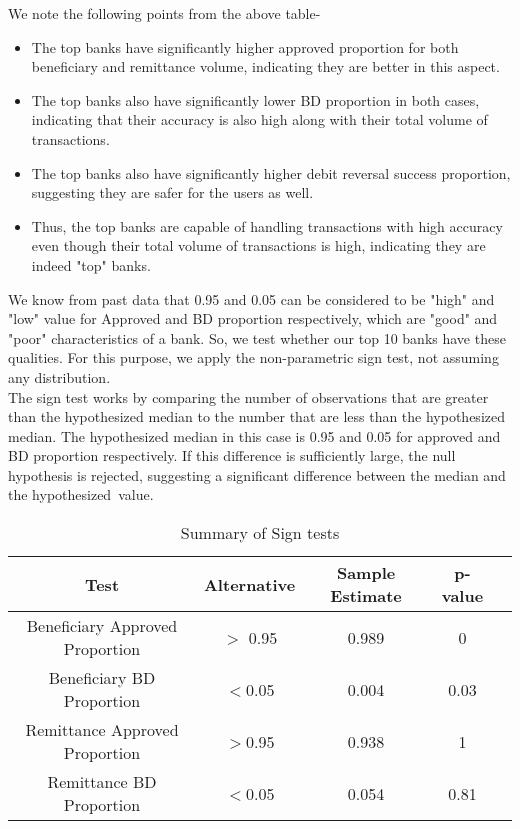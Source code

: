 \documentclass{article}
\begin{document}
We note the following points from the above table-
\begin{itemize}
    \item The top banks have significantly higher approved proportion for both beneficiary and remittance volume, indicating they are better in this aspect.
    \item The top banks also have significantly lower BD proportion in both cases, indicating that their accuracy is also high along with their total volume of transactions.
    \item  The top banks also have significantly higher debit reversal success proportion, suggesting they are safer for the users as well. 
    \item Thus, the top banks are capable of handling transactions with high accuracy even though their total volume of transactions is high, indicating they are indeed "top" banks.
\end{itemize}

We know from past data that 0.95 and 0.05 can be considered to be "high" and "low" value for Approved and BD proportion respectively, which are "good" and "poor" characteristics of a bank. So, we test whether our top 10 banks have these qualities. For this purpose, we apply the non-parametric sign test, not assuming any distribution.\\

The sign test works by comparing the number of observations that are greater than the hypothesized median to the number that are less than the hypothesized median. The hypothesized median in this case is 0.95 and 0.05 for approved and BD proportion respectively. If this difference is sufficiently large, the null hypothesis is rejected, suggesting a significant difference between the median and the hypothesized value.

\begin{table}[h]
\centering
\caption{Summary of Sign tests}
\begin{tabular}{|c|c|c|c|c|}
\hline
\textbf{Test} & \textbf{Alternative} & \textbf{Sample Estimate} & \textbf{p-value} \\
\hline
Beneficiary Approved Proportion & $>$ 0.95 & 0.989 & 0 \\
Beneficiary BD Proportion & $<$0.05 & 0.004 & 0.03 \\
Remittance Approved Proportion & $>$0.95 & 0.938 & 1  \\
Remittance BD Proportion & $<$0.05 & 0.054 & 0.81 \\
\hline
\end{tabular}
\label{tab:sample_estimates_pvalues}
\end{table}
\end{document}
